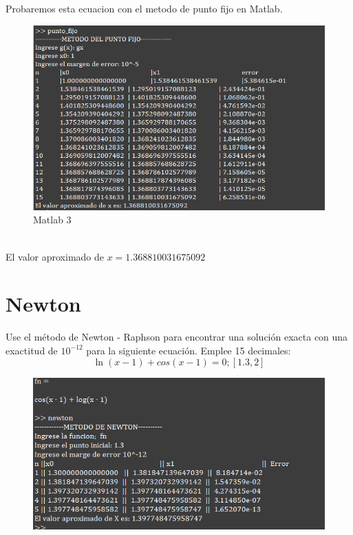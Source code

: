 \documentclass{article}
\theoremstyle{mytheoremstyle}
\theoremstyle{mytheoremstyle}
\theoremstyle{myproblemstyle}
\begin{document}
    \noindent Probaremos esta ecuacion con el metodo de punto fijo en Matlab.
    \begin{figure}[ht]
        \includegraphics[scale=0.9]{img/ejemplo_clasePunto_3.png}
        \caption[Metodo Punto Fijo]{Matlab 3}
    \end{figure}
    \\El valor aproximado de $x=1.368810031675092$


    \section*{Newton}Use el método de Newton - Raphson para encontrar una solución exacta con una exactitud de $10^{-12}$ para la siguiente ecuación. Emplee 15 decimales: 
    \[
        \ln(x-1)+cos(x-1)=0 ; [1.3,2]
    \]
    \begin{figure}[ht]
        \includegraphics*[scale=0.9]{img/ejemplo3.png}
    \end{figure}
    
    
    
    
\end{document}
